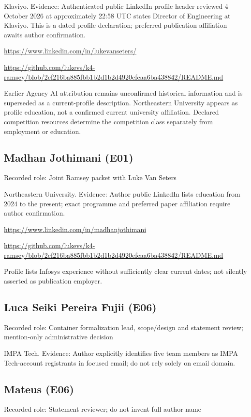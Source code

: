\documentclass[11pt,a4paper]{article}
\begin{document}
Klaviyo. Evidence: Authenticated public LinkedIn profile header reviewed 4 October 2026 at approximately 22:58 UTC states Director of Engineering at Klaviyo. This is a dated profile declaration; preferred publication affiliation awaits author confirmation.

{\small \url{https://www.linkedin.com/in/lukevanseters/}\par}

{\small \url{https://github.com/lukevs/k4-ramsey/blob/2cf216ba885fbb1b2d1b2d4920efeaa6ba438842/README.md}\par}

Earlier Agency AI attribution remains unconfirmed historical information and is superseded as a current-profile description. Northeastern University appears as profile education, not a confirmed current university affiliation. Declared competition resources determine the competition class separately from employment or education.

\subsection{Madhan Jothimani (E01)}
Recorded role: Joint Ramsey packet with Luke Van Seters

Northeastern University. Evidence: Author public LinkedIn lists education from 2024 to the present; exact programme and preferred paper affiliation require author confirmation.

{\small \url{https://www.linkedin.com/in/madhanjothimani}\par}

{\small \url{https://github.com/lukevs/k4-ramsey/blob/2cf216ba885fbb1b2d1b2d4920efeaa6ba438842/README.md}\par}

Profile lists Infosys experience without sufficiently clear current dates; not silently asserted as publication employer.

\subsection{Luca Seiki Pereira Fujii (E06)}
Recorded role: Container formalization lead, scope/design and statement review; mention-only administrative decision

IMPA Tech. Evidence: Author explicitly identifies five team members as IMPA Tech-account registrants in focused email; do not rely solely on email domain.

\subsection{Mateus (E06)}
Recorded role: Statement reviewer; do not invent full author name
\end{document}

